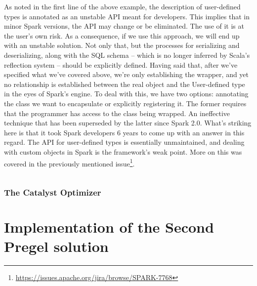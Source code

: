 As noted in the first line of the above example, the description of user-defined types is annotated as an unstable API meant for developers. This implies that in minor Spark versions, the API may change or be eliminated. The use of it is at the user's own risk. As a consequence, if we use this approach, we will end up with an unstable solution. Not only that, but the processes for serializing and deserializing, along with the SQL schema -- which is no longer inferred by Scala's reflection system -- should be explicitly defined. Having said that, after we've specified what we've covered above, we're only establishing the wrapper, and yet no relationship is established between the real object and the User-defined type in the eyes of Spark's engine. To deal with this, we have two options: annotating the class we want to encapsulate or explicitly registering it. The former requires that the programmer has access to the class being wrapped. An ineffective technique that has been superseded by the latter since Spark 2.0. What's striking here is that it took Spark developers 6 years to come up with an answer in this regard. The API for user-defined types is essentially unmaintained, and dealing with custom objects in Spark is the framework's weak point. More on this was covered in the previously mentioned issue\footnote{\url{https://issues.apache.org/jira/browse/SPARK-7768}}.

\begin{code}
    \inputminted{scala}{code/listings/8-2_udtRegistration.scala}
\end{code}

\subsubsection{The Catalyst Optimizer}

\section{Implementation of the Second Pregel solution}